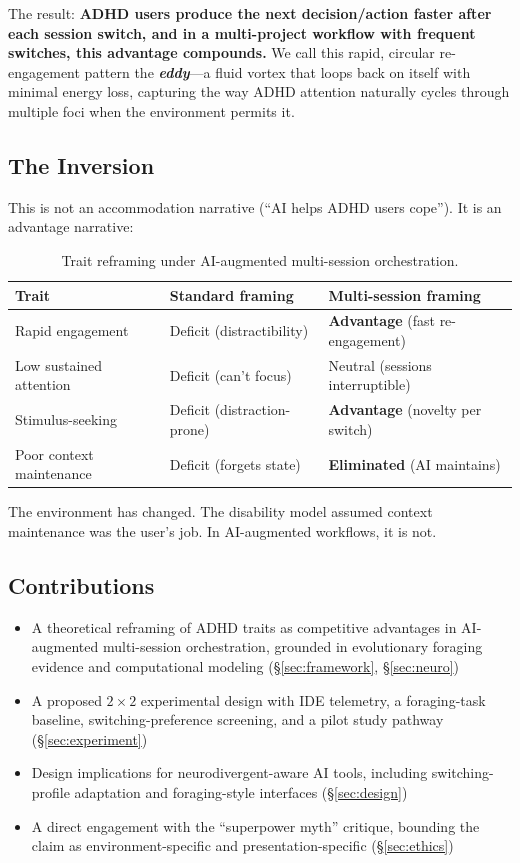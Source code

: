 \documentclass[sigconf,nonacm]{acmart}
\begin{document}
The result: \textbf{ADHD users produce the next decision/action faster after each session switch, and in a multi-project workflow with frequent switches, this advantage compounds.} We call this rapid, circular re-engagement pattern the \textbf{\emph{eddy}}---a fluid vortex that loops back on itself with minimal energy loss, capturing the way ADHD attention naturally cycles through multiple foci when the environment permits it.

\subsection{The Inversion}

This is not an accommodation narrative (``AI helps ADHD users cope''). It is an advantage narrative:

\begin{table}[htbp]
\caption{Trait reframing under AI-augmented multi-session orchestration.}
\label{tab:inversion}
\begin{tabularx}{\columnwidth}{@{}lXX@{}}
\toprule
\textbf{Trait} & \textbf{Standard framing} & \textbf{Multi-session framing} \\
\midrule
Rapid engagement & Deficit (distractibility) & \textbf{Advantage} (fast re-engagement) \\
Low sustained attention & Deficit (can't focus) & Neutral (sessions interruptible) \\
Stimulus-seeking & Deficit (distraction-prone) & \textbf{Advantage} (novelty per switch) \\
Poor context maintenance & Deficit (forgets state) & \textbf{Eliminated} (AI maintains) \\
\bottomrule
\end{tabularx}
\end{table}

The environment has changed. The disability model assumed context maintenance was the user's job. In AI-augmented workflows, it is not.

\subsection{Contributions}

\begin{itemize}
  \item A theoretical reframing of ADHD traits as competitive advantages in AI-augmented multi-session orchestration, grounded in evolutionary foraging evidence and computational modeling (\S\ref{sec:framework}, \S\ref{sec:neuro})
  \item A proposed $2 \times 2$ experimental design with IDE telemetry, a foraging-task baseline, switching-preference screening, and a pilot study pathway (\S\ref{sec:experiment})
  \item Design implications for neurodivergent-aware AI tools, including switching-profile adaptation and foraging-style interfaces (\S\ref{sec:design})
  \item A direct engagement with the ``superpower myth'' critique, bounding the claim as environment-specific and presentation-specific (\S\ref{sec:ethics})
\end{itemize}
\end{document}
